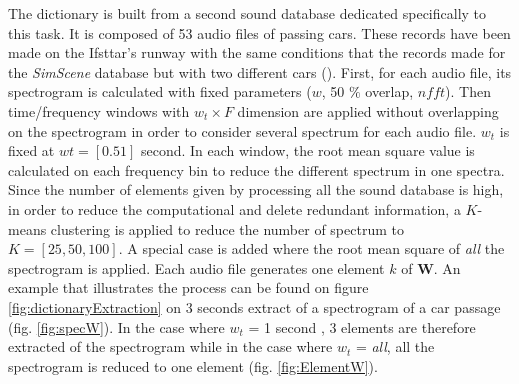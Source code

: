 \documentclass[twocolumn,a4paper,10pt]{article}
\begin{document}
The dictionary is built from a second sound database dedicated specifically to this task. It is composed of 53 audio files of passing cars. These records have been made on the Ifsttar's runway with the same conditions that the records made for the \textit{SimScene} database but with two different cars (). First, for each audio file, its spectrogram is calculated with fixed parameters ($w$, 50 $\%$ overlap, $nfft$). Then time/frequency windows with $w_t \times F$ dimension are applied without overlapping on the spectrogram in order to consider several spectrum for each audio file. $w_t$ is fixed at $wt = [0.5 1]$ second. In each window, the root mean square value is calculated on each frequency bin to reduce the different spectrum in one spectra. Since the number of elements given by processing all the sound database is high, in order to reduce the computational and delete redundant information, a $K$-means clustering is applied to reduce the number of spectrum to $K = \left[ 25, 50, 100 \right]$. A special case is added where the root mean square of \textit{all} the spectrogram is applied. Each audio file generates one element $k$ of $\mathbf{W}$. An example that illustrates the process can be found on figure \ref{fig:dictionaryExtraction} on 3 seconds extract of a spectrogram of a car passage (fig. \ref{fig:specW}). In the case where $w_t$ = 1 second , 3 elements are therefore extracted of the spectrogram while in the case where $w_t$ = \textit{all}, all the spectrogram is reduced to one element (fig. \ref{fig:ElementW}).
\end{document}
